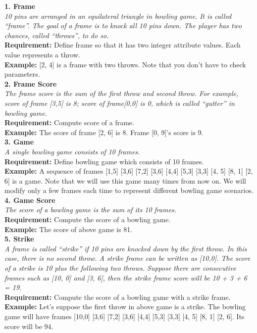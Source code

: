 \noindent \textbf{1. Frame} \\
\textit{10 pins are arranged in an equilateral triangle in bowling game. It is called ``frame''. The goal of a frame is to knock all 10 pins down. The player has two chances, called ``throws'',  to do so.} \\
\textbf{Requirement:} Define frame so that it has two integer attribute values. Each value represents a throw. \\
\textbf{Example:} [2, 4] is a frame with two throws. Note that you don't have to check parameters.\\

\noindent \textbf{2. Frame Score} \\
\textit{The frame score is the sum of the first throw and second throw. For example, score of frame [3,5] is 8;  score of frame[0,0] is 0, which is called ``gutter'' in bowling game.  
} \\
\textbf{Requirement:} Compute score of a frame. \\
\textbf{Example:} The score of frame [2, 6]  is 8.  Frame [0, 9]'s score is 9. \\

\noindent \textbf{3. Game} \\
\textit{A single bowling game consists of 10 frames.} \\
\textbf{Requirement:} Define bowling game which consists of 10 frames. \\
\textbf{Example:} A sequence of frames  [1,5] [3,6] [7,2] [3,6] [4,4] [5,3] [3,3] [4, 5] [8, 1] [2, 6] is a game. Note that we will use this game many times from now on. We will modify only a few frames each time to represent different bowling game scenarios.\\

\noindent \textbf{4. Game Score} \\
\textit{The score of a bowling game is the sum of its 10 frames.} \\
\textbf{Requirement:} Compute the score of a bowling game. \\
\textbf{Example:} The score of above game is 81. \\

\noindent \textbf{5. Strike} \\
\textit{A frame is called ``strike'' if 10 pins are knocked down by the first throw. In this case, there is no second throw. A strike frame can be written as [10,0]. The score of  a strike is 10 plus the following two throws. Suppose there are consecutive frames such as [10, 0] and [3, 6], then the strike frame score will be 10 + 3 + 6 = 19.} \\
\textbf{Requirement:} Compute the score of a bowling game with a strike frame. \\
\textbf{Example:} Let's suppose the first throw in above game is a strike. The bowling game will have frames [10,0] [3,6] [7,2] [3,6] [4,4] [5,3] [3,3] [4, 5] [8, 1] [2, 6]. Its score will be 94.  
\\

